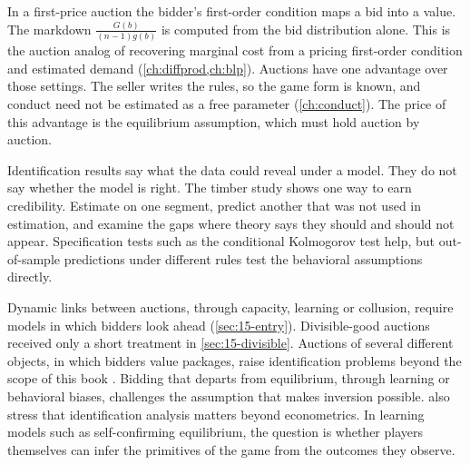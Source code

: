 In a first-price auction the bidder's first-order condition maps a bid into a value. The markdown
$\frac{G(b)}{(n-1)g(b)}$ is computed from the bid distribution alone. This is the auction analog of recovering
marginal cost from a pricing first-order condition and estimated demand (\cref{ch:diffprod,ch:blp}). Auctions
have one advantage over those settings. The seller writes the rules, so the game form is known, and conduct
need not be estimated as a free parameter (\cref{ch:conduct}). The price of this advantage is the equilibrium
assumption, which must hold auction by auction.

Identification results say what the data could reveal under a model. They do not say whether the model is
right. The timber study shows one way to earn credibility. Estimate on one segment, predict another that was not
used in estimation, and examine the gaps where theory says they should and should not appear. Specification
tests such as the conditional Kolmogorov test help, but out-of-sample predictions under different rules test the
behavioral assumptions directly.

Dynamic links between auctions, through capacity, learning or collusion, require models in which bidders look
ahead (\cref{sec:15-entry}). Divisible-good auctions received only a short treatment in
\cref{sec:15-divisible}. Auctions of several different objects, in which bidders value packages, raise
identification problems beyond the scope of this book \citep[Section~10]{AtheyHaile2007}. Bidding that departs from equilibrium, through
learning or behavioral biases, challenges the assumption that makes inversion possible.
\citet[Section 11]{AtheyHaile2007} also stress that identification analysis matters beyond econometrics. In
learning models such as self-confirming equilibrium, the question is whether players themselves can infer the
primitives of the game from the outcomes they observe.
